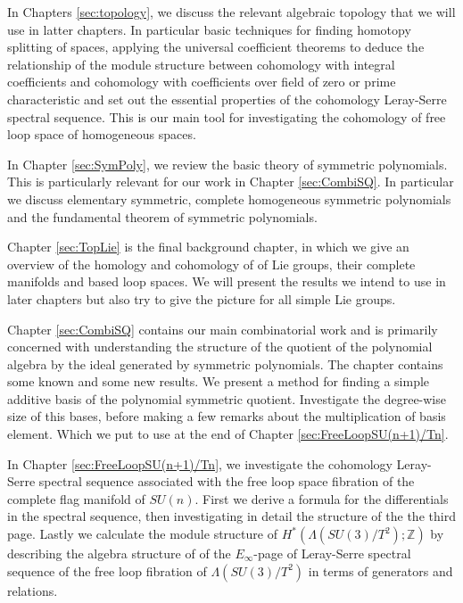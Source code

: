 \documentclass{article}
\theoremstyle{plain}
\theoremstyle{definition}
\numberwithin{thm}{section}
\begin{document}
			In Chapters \ref{sec:topology}, we discuss the relevant algebraic topology that we will use in latter chapters.
			In particular basic techniques for finding homotopy splitting of spaces,
			applying the universal coefficient theorems to deduce the relationship of the module structure between cohomology with integral coefficients
			and cohomology with coefficients over field of zero or prime characteristic
			and set out the essential properties of the cohomology Leray-Serre spectral sequence.
			This is our main tool for investigating the cohomology of free loop space of homogeneous spaces.
			
			In Chapter \ref{sec:SymPoly}, we review the basic theory of symmetric polynomials.
			This is particularly relevant for our work in Chapter \ref{sec:CombiSQ}. 
			In particular we discuss elementary symmetric, complete homogeneous symmetric polynomials and the fundamental theorem of symmetric polynomials.
			
			Chapter \ref{sec:TopLie} is the final background chapter, in which we give an overview of the homology and cohomology of
			of Lie groups, their complete manifolds and based loop spaces.
			We will present the results we intend to use in later chapters but also try to give the picture for all simple Lie groups.
			
			Chapter \ref{sec:CombiSQ} contains our main combinatorial work and is primarily concerned with understanding the structure of the quotient of
			the polynomial algebra by the ideal generated by symmetric polynomials.
			The chapter contains some known and some new results.
			We present a method for finding a simple additive basis of the polynomial symmetric quotient.
			Investigate the degree-wise size of this bases,
			before making a few remarks about the multiplication of basis element. 
			Which we put to use at the end of Chapter \ref{sec:FreeLoopSU(n+1)/Tn}. 
			
			In Chapter \ref{sec:FreeLoopSU(n+1)/Tn}, we investigate the cohomology Leray-Serre spectral sequence associated with the free loop space fibration
			of the complete flag manifold of $SU(n)$.
			First we derive a formula for the differentials in the spectral sequence, then investigating in detail the structure of the the third page.
			Lastly we calculate the module structure of $H^*(\Lambda(SU(3)/T^2);\mathbb{Z})$ by describing the algebra structure of
		  of the $E_\infty$-page of Leray-Serre spectral sequence of the free loop fibration of $\Lambda(SU(3)/T^2)$ in terms of generators and relations.
			
\end{document}
